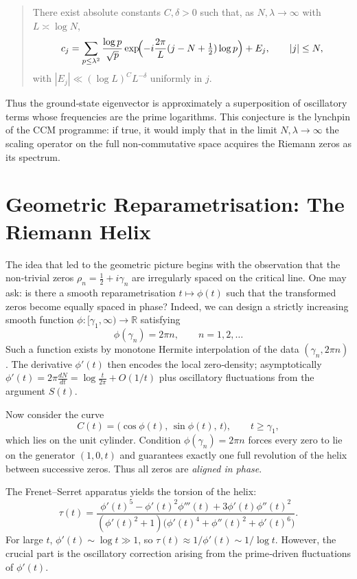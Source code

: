 \documentclass[12pt,a4paper]{article}
\newcommand{\R}{\mathbb{R}}
\begin{document}
\begin{quote}
There exist absolute constants \(C,\delta>0\) such that, as \(N,\lambda\to\infty\) with \(L\asymp\log N\),
\[
c_j=\sum_{p\le\lambda^2}\frac{\log p}{\sqrt{p}}\exp\!\Bigl(-i\frac{2\pi}{L}(j-N+\tfrac12)\log p\Bigr)+E_j,\qquad |j|\le N,
\]
with \(|E_j|\ll (\log L)^C L^{-\delta}\) uniformly in \(j\).
\end{quote}

Thus the ground‑state eigenvector is approximately a superposition of oscillatory terms whose frequencies are the prime logarithms. This conjecture is the lynchpin of the CCM programme: if true, it would imply that in the limit \(N,\lambda\to\infty\) the scaling operator on the full non‑commutative space acquires the Riemann zeros as its spectrum.

\section{Geometric Reparametrisation: The Riemann Helix}
The idea that led to the geometric picture begins with the observation that the non‑trivial zeros \( \rho_n=\tfrac12+i\gamma_n\) are irregularly spaced on the critical line. One may ask: is there a smooth reparametrisation \(t\mapsto\phi(t)\) such that the transformed zeros become equally spaced in phase? Indeed, we can design a strictly increasing smooth function \(\phi:[\gamma_1,\infty)\to\R\) satisfying
\[
\phi(\gamma_n)=2\pi n,\qquad n=1,2,\dots
\]
Such a function exists by monotone Hermite interpolation of the data \((\gamma_n,2\pi n)\). The derivative \(\phi'(t)\) then encodes the local zero‑density; asymptotically \(\phi'(t)=2\pi\frac{dN}{dt} = \log\frac{t}{2\pi}+O(1/t)\) plus oscillatory fluctuations from the argument \(S(t)\).

Now consider the curve
\[
C(t)=\bigl(\cos\phi(t),\,\sin\phi(t),\,t\bigr),\qquad t\ge\gamma_1,
\]
which lies on the unit cylinder. Condition \(\phi(\gamma_n)=2\pi n\) forces every zero to lie on the generator \((1,0,t)\) and guarantees exactly one full revolution of the helix between successive zeros. Thus all zeros are \emph{aligned in phase}.

The Frenet–Serret apparatus yields the torsion of the helix:
\begin{equation}\label{eq:torsion}
\tau(t)=\frac{\phi'(t)^5-\phi'(t)^2\phi'''(t)+3\phi'(t)\phi''(t)^2}{(\phi'(t)^2+1)\bigl(\phi'(t)^4+\phi''(t)^2+\phi'(t)^6\bigr)}.
\end{equation}
For large \(t\), \(\phi'(t)\sim\log t\gg1\), so \(\tau(t)\approx 1/\phi'(t)\sim 1/\log t\). However, the crucial part is the oscillatory correction arising from the prime‑driven fluctuations of \(\phi'(t)\).
\end{document}
